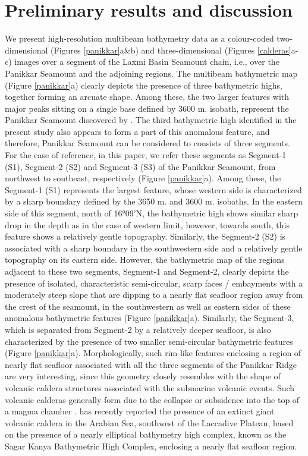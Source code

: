\documentclass[twocolumn]{article}
\begin{document}
\section{Preliminary results and discussion}
We present high-resolution multibeam bathymetry data as a colour-coded two-dimensional (Figures \ref{panikkar}a\&b) and three-dimensional (Figures \ref{calderas}a-c) images over a segment of the Laxmi Basin Seamount chain, i.e., over the Panikkar Seamount and the adjoining regions. The multibeam bathymetric map (Figure \ref{panikkar}a) clearly depicts the presence of three bathymetric highs, together forming an arcuate shape. Among these, the two larger features with major peaks sitting on a single base defined by 3600 m. isobath, represent the Panikkar Seamount discovered by \cite{Bhattacharya1994b}. The third bathymetric high identified in the present study also appears to form a part of this anomalous feature, and therefore, Panikkar Seamount can be considered to consists of three segments. For the ease of reference, in this paper, we refer these segments as Segment-1 (S1), Segment-2 (S2) and Segment-3 (S3) of the Panikkar Seamount, from northwest to southeast, respectively (Figure \ref{panikkar}a). Among these, the Segment-1 (S1) represents the largest feature, whose western side is characterized by a sharp boundary defined by the 3650 m. and 3600 m. isobaths. In the eastern side of this segment, north of 16°09’N, the bathymetric high shows similar sharp drop in the depth as in the case of western limit, however, towards south, this feature shows a relatively gentle topography. Similarly, the Segment-2 (S2) is associated with a sharp boundary in the southwestern side and a relatively gentle topography on its eastern side. However, the bathymetric map of the regions adjacent to these two segments, Segment-1 and Segment-2, clearly depicts the presence of isolated, characteristic semi-circular, scarp faces / embayments with a moderately steep slope that are dipping to a nearly flat seafloor region away from the crest of the seamount, in the southwestern as well as eastern sides of these anomalous bathymetric features (Figure \ref{panikkar}a). Similarly, the Segment-3, which is separated from Segment-2 by a relatively deeper seafloor, is also characterized by the presence of two smaller semi-circular bathymetric features (Figure \ref{panikkar}a). Morphologically, such rim-like features enclosing a region of nearly flat seafloor associated with all the three segments of the Panikkar Ridge are very interesting, since this geometry closely resembles with the shape of volcanic caldera structures associated with the submarine volcanic events. Such volcanic calderas generally form due to the collapse or subsidence into the top of a magma chamber \citep{Cole2005}. \cite{Bijesh2021} has recently reported the presence of an extinct giant volcanic caldera in the Arabian Sea, southwest of the Laccadive Plateau, based on the presence of a nearly elliptical bathymetry high complex, known as the Sagar Kanya Bathymetric High Complex, enclosing a nearly flat seafloor region.
\end{document}
